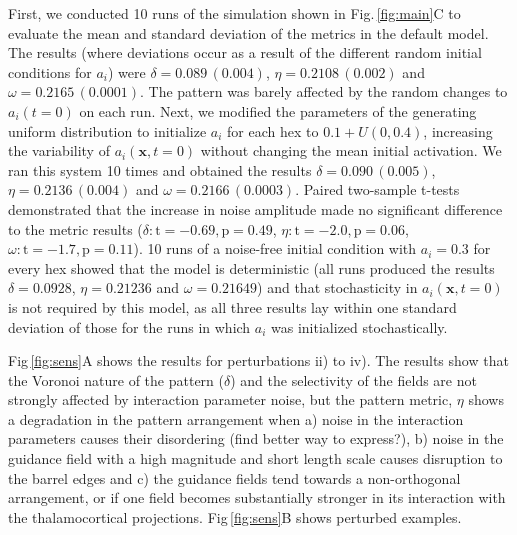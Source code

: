 \documentclass[9pt,lineno]{elife}
\newcommand{\MPthreeSens}[1]{\textcolor{revgblack}{#1}}
\newcommand{\mb}[1]{\mathbf{#1}}
\begin{document}
\MPthreeSens{First, we conducted 10 runs of the simulation shown in
  Fig.\,\ref{fig:main}C to evaluate the mean and standard deviation of the
  metrics in the default model. The results (where deviations occur as a
  result of the different random initial conditions for $a_i$) were
  $\delta=0.089\,(0.004)$, $\eta=0.2108\,(0.002)$ and
  $\omega=0.2165\,(0.0001)$. The pattern was barely affected by the random
  changes to $a_i(t=0)$ on each run.}
%
\MPthreeSens{Next, we modified the parameters of the generating uniform
  distribution to initialize $a_i$ for each hex to $0.1+{U}(0,0.4)$,
  increasing the variability of $a_i(\mb{x},t=0)$ without changing the mean
  initial activation. We ran this system 10 times and obtained the results
  $\delta=0.090\,(0.005)$, $\eta=0.2136\,(0.004)$ and
  $\omega=0.2166\,(0.0003)$. Paired two-sample t-tests demonstrated that the
  increase in noise amplitude made no significant difference to the metric
  results ($\delta: \mathrm{t}=-0.69,\mathrm{p}=0.49$, $\eta:
  \mathrm{t}=-2.0,\mathrm{p}=0.06$, $\omega:
  \mathrm{t}=-1.7,\mathrm{p}=0.11$). 10 runs of a noise-free initial condition
  with $a_i=0.3$ for every hex showed that the model is deterministic (all
  runs produced the results $\delta=0.0928$, $\eta=0.21236$ and
  $\omega=0.21649$) and that stochasticity in $a_i(\mb{x},t=0)$ is not
  required by this model, as all three results lay within one standard
  deviation of those for the runs in which $a_i$ was initialized
  stochastically.}


\MPthreeSens{Fig\,\ref{fig:sens}A shows the results for perturbations ii) to
  iv). The results show that the Voronoi nature of the pattern ($\delta$) and
  the selectivity of the fields are not strongly affected by interaction
  parameter noise, but the pattern metric, $\eta$ shows a degradation in the
  pattern arrangement when a) noise in the interaction parameters causes their
  disordering (find better way to express?), b) noise in the guidance field
  with a high magnitude and short length scale causes disruption to the barrel
  edges and c) the guidance fields tend towards a non-orthogonal arrangement,
  or if one field becomes substantially stronger in its interaction with the
  thalamocortical projections. Fig\,\ref{fig:sens}B shows perturbed examples.}
\end{document}
